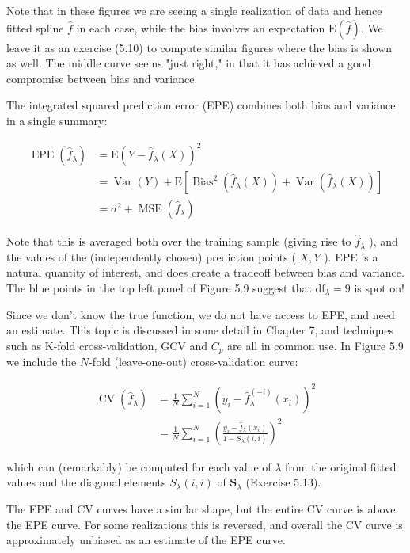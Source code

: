 \documentclass[10pt]{article}
\begin{document}
Note that in these figures we are seeing a single realization of data and hence fitted spline $\hat{f}$ in each case, while the bias involves an expectation $\mathrm{E}(\hat{f})$. We leave it as an exercise (5.10) to compute similar figures where the bias is shown as well. The middle curve seems "just right," in that it has achieved a good compromise between bias and variance.

The integrated squared prediction error (EPE) combines both bias and variance in a single summary:


\begin{align*}
\operatorname{EPE}\left(\hat{f}_{\lambda}\right) & =\mathrm{E}\left(Y-\hat{f}_{\lambda}(X)\right)^{2} \\
& =\operatorname{Var}(Y)+\mathrm{E}\left[\operatorname{Bias}^{2}\left(\hat{f}_{\lambda}(X)\right)+\operatorname{Var}\left(\hat{f}_{\lambda}(X)\right)\right] \\
& =\sigma^{2}+\operatorname{MSE}\left(\hat{f}_{\lambda}\right) \tag{5.25}
\end{align*}


Note that this is averaged both over the training sample (giving rise to $\hat{f}_{\lambda}$ ), and the values of the (independently chosen) prediction points ( $X, Y$ ). EPE is a natural quantity of interest, and does create a tradeoff between bias and variance. The blue points in the top left panel of Figure 5.9 suggest that $\mathrm{df}_{\lambda}=9$ is spot on!

Since we don't know the true function, we do not have access to EPE, and need an estimate. This topic is discussed in some detail in Chapter 7, and techniques such as K-fold cross-validation, GCV and $C_{p}$ are all in common use. In Figure 5.9 we include the $N$-fold (leave-one-out) cross-validation curve:


\begin{align*}
\operatorname{CV}\left(\hat{f}_{\lambda}\right) & =\frac{1}{N} \sum_{i=1}^{N}\left(y_{i}-\hat{f}_{\lambda}^{(-i)}\left(x_{i}\right)\right)^{2}  \tag{5.26}\\
& =\frac{1}{N} \sum_{i=1}^{N}\left(\frac{y_{i}-\hat{f}_{\lambda}\left(x_{i}\right)}{1-S_{\lambda}(i, i)}\right)^{2} \tag{5.27}
\end{align*}


which can (remarkably) be computed for each value of $\lambda$ from the original fitted values and the diagonal elements $S_{\lambda}(i, i)$ of $\mathbf{S}_{\lambda}$ (Exercise 5.13).

The EPE and CV curves have a similar shape, but the entire CV curve is above the EPE curve. For some realizations this is reversed, and overall the CV curve is approximately unbiased as an estimate of the EPE curve.
\end{document}
